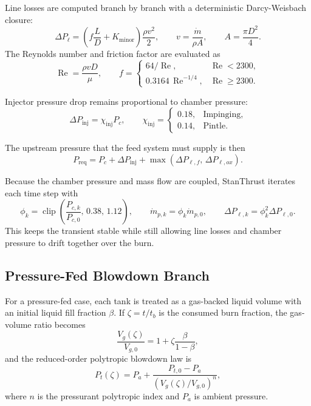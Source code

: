 \documentclass[11pt]{article}
\newcommand{\clip}{\operatorname{clip}}
\newcommand{\Rey}{\operatorname{Re}}
\begin{document}
Line losses are computed branch by branch with a deterministic Darcy-Weisbach closure:
\begin{equation}
\Delta P_{\ell}
=
\left(
f\frac{L}{D}+K_{\text{minor}}
\right)
\frac{\rho v^2}{2},
\qquad
v=\frac{\dot{m}}{\rho A},
\qquad
A=\frac{\pi D^2}{4}.
\label{eq:feed-darcy}
\end{equation}
The Reynolds number and friction factor are evaluated as
\begin{equation}
\Rey=\frac{\rho v D}{\mu},
\qquad
f=
\begin{cases}
64/\Rey, & \Rey<2300, \\
0.3164\,\Rey^{-1/4}, & \Rey\ge 2300.
\end{cases}
\label{eq:feed-reynolds}
\end{equation}

Injector pressure drop remains proportional to chamber pressure:
\begin{equation}
\Delta P_{\text{inj}} = \chi_{\text{inj}} P_c,
\qquad
\chi_{\text{inj}}=
\begin{cases}
0.18, & \text{Impinging},\\
0.14, & \text{Pintle}.
\end{cases}
\label{eq:feed-injector-drop}
\end{equation}

The upstream pressure that the feed system must supply is then
\begin{equation}
P_{\text{req}}
=
P_c + \Delta P_{\text{inj}}
+
\max\!\left(\Delta P_{\ell,f},\,\Delta P_{\ell,ox}\right).
\label{eq:feed-required-pressure}
\end{equation}

Because the chamber pressure and mass flow are coupled, StanThrust iterates each time step with
\begin{equation}
\phi_k = \clip\!\left(\frac{P_{c,k}}{P_{c,0}},\,0.38,\,1.12\right),
\qquad
\dot{m}_{p,k} = \phi_k \dot{m}_{p,0},
\qquad
\Delta P_{\ell,k} = \phi_k^2 \Delta P_{\ell,0}.
\label{eq:feed-flow-scaling}
\end{equation}
This keeps the transient stable while still allowing line losses and chamber pressure to drift together over the burn.

\subsection{Pressure-Fed Blowdown Branch}
For a pressure-fed case, each tank is treated as a gas-backed liquid volume with an initial liquid fill fraction $\beta$. If $\zeta=t/t_b$ is the consumed burn fraction, the gas-volume ratio becomes
\begin{equation}
\frac{V_g(\zeta)}{V_{g,0}}
=
1+\zeta\frac{\beta}{1-\beta},
\label{eq:blowdown-volume-ratio}
\end{equation}
and the reduced-order polytropic blowdown law is
\begin{equation}
P_t(\zeta)
=
P_a+\frac{P_{t,0}-P_a}{\left(V_g(\zeta)/V_{g,0}\right)^n},
\label{eq:blowdown-pressure}
\end{equation}
where $n$ is the pressurant polytropic index and $P_a$ is ambient pressure.
\end{document}
